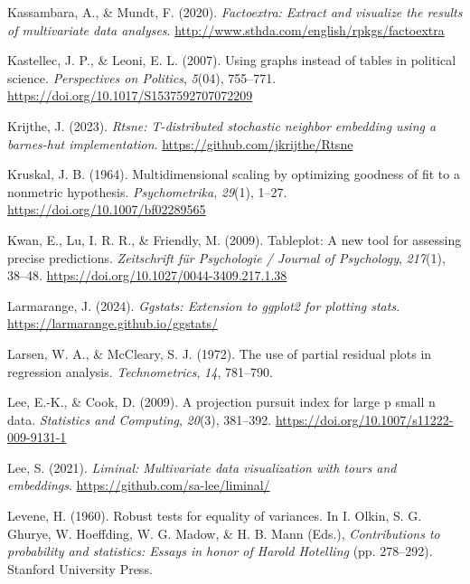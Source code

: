 \documentclass[
  letterpaper,
  10pt,
  krantz2]{krantz}
\newlength{\cslhangindent}
\newenvironment{CSLReferences}[2] %
 {\begin{list}{}{%
  \setlength{\itemindent}{0pt}
  \setlength{\leftmargin}{0pt}
  \setlength{\parsep}{0pt}
  \ifodd #1
   \setlength{\leftmargin}{\cslhangindent}
   \setlength{\itemindent}{-1\cslhangindent}
  \fi
  \setlength{\itemsep}{#2\baselineskip}}}
 {\end{list}}
\begin{document}
{\begin{CSLReferences}{1}{0}
Kassambara, A., \& Mundt, F. (2020). \emph{Factoextra: Extract and
visualize the results of multivariate data analyses}.
\url{http://www.sthda.com/english/rpkgs/factoextra}

Kastellec, J. P., \& Leoni, E. L. (2007). Using graphs instead of tables
in political science. \emph{Perspectives on Politics}, \emph{5}(04),
755--771. \url{https://doi.org/10.1017/S1537592707072209}

Krijthe, J. (2023). \emph{Rtsne: T-distributed stochastic neighbor
embedding using a barnes-hut implementation}.
\url{https://github.com/jkrijthe/Rtsne}

Kruskal, J. B. (1964). Multidimensional scaling by optimizing goodness
of fit to a nonmetric hypothesis. \emph{Psychometrika}, \emph{29}(1),
1--27. \url{https://doi.org/10.1007/bf02289565}

Kwan, E., Lu, I. R. R., \& Friendly, M. (2009). Tableplot: A new tool
for assessing precise predictions. \emph{Zeitschrift f{ü}r Psychologie /
Journal of Psychology}, \emph{217}(1), 38--48.
\url{https://doi.org/10.1027/0044-3409.217.1.38}

Larmarange, J. (2024). \emph{Ggstats: Extension to ggplot2 for plotting
stats}. \url{https://larmarange.github.io/ggstats/}

Larsen, W. A., \& McCleary, S. J. (1972). The use of partial residual
plots in regression analysis. \emph{Technometrics}, \emph{14}, 781--790.

Lee, E.-K., \& Cook, D. (2009). A projection pursuit index for large p
small n data. \emph{Statistics and Computing}, \emph{20}(3), 381--392.
\url{https://doi.org/10.1007/s11222-009-9131-1}

Lee, S. (2021). \emph{Liminal: Multivariate data visualization with
tours and embeddings}. \url{https://github.com/sa-lee/liminal/}

Levene, H. (1960). Robust tests for equality of variances. In I. Olkin,
S. G. Ghurye, W. Hoeffding, W. G. Madow, \& H. B. Mann (Eds.),
\emph{Contributions to probability and statistics: Essays in honor of
{Harold Hotelling}} (pp. 278--292). Stanford University Press.


\end{CSLReferences}}
\end{document}
